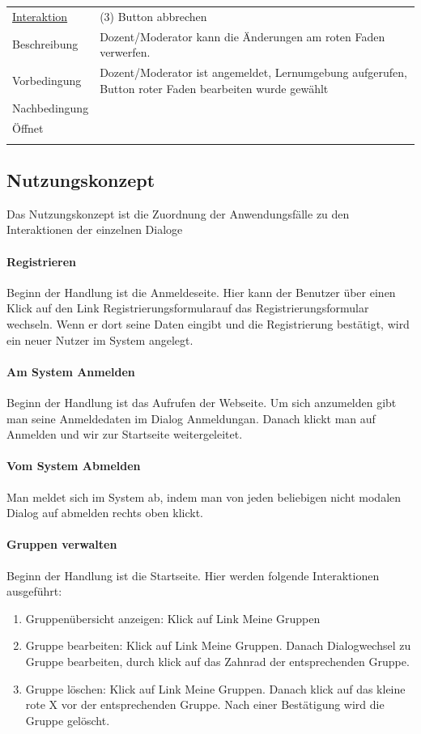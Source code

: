 \documentclass[12pt,a4paper]{article}
\begin{document}
{\begin{tabular}{l p{12cm}}
\underline{Interaktion} & (3) Button abbrechen   \\ 
Beschreibung   	 		& Dozent/Moderator kann die Änderungen am roten Faden verwerfen.\\
Vorbedingung	 		& Dozent/Moderator ist angemeldet, Lernumgebung aufgerufen, Button roter Faden bearbeiten wurde gewählt\\
Nachbedingung	 		& \\
Öffnet			 		& \\\\
\end{tabular}



\subsection{Nutzungskonzept}
Das Nutzungskonzept ist die Zuordnung der Anwendungsfälle zu den Interaktionen der einzelnen Dialoge 
\paragraph{Registrieren}
Beginn der Handlung ist die Anmeldeseite. Hier kann der Benutzer über einen Klick auf den Link \glqq Registrierungsformular\grqq auf das Registrierungsformular wechseln. Wenn er dort seine Daten eingibt und die Registrierung bestätigt, wird ein neuer Nutzer im System angelegt.

\paragraph{Am System Anmelden}
Beginn der Handlung ist das Aufrufen der Webseite. Um sich anzumelden gibt man seine Anmeldedaten im Dialog \glqq Anmeldung\grqq  an. Danach klickt man auf Anmelden und wir zur Startseite weitergeleitet.

\paragraph{Vom System Abmelden}
Man meldet sich im System ab, indem man von jeden beliebigen nicht modalen Dialog auf abmelden rechts oben klickt.

\paragraph{Gruppen verwalten}
Beginn der Handlung ist die Startseite. Hier werden folgende Interaktionen ausgeführt:
\begin{enumerate}
	\item \glqq Gruppenübersicht anzeigen\grqq: Klick auf Link \glqq Meine Gruppen\grqq
	\item \glqq Gruppe bearbeiten\grqq: Klick auf Link \glqq Meine Gruppen\grqq . Danach Dialogwechsel zu  \glqq Gruppe bearbeiten\grqq, durch klick auf das Zahnrad der entsprechenden Gruppe.
	\item \glqq Gruppe löschen\grqq: Klick auf Link \glqq Meine Gruppen\grqq . Danach klick auf das kleine rote X vor der entsprechenden Gruppe. Nach einer Bestätigung wird die Gruppe gelöscht.
\end{enumerate}

}
\end{document}
